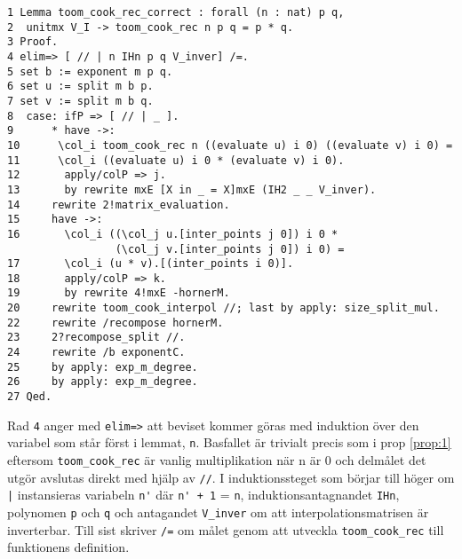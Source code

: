 \begin{verbatim}
1 Lemma toom_cook_rec_correct : forall (n : nat) p q,
2  unitmx V_I -> toom_cook_rec n p q = p * q.
3 Proof.
4 elim=> [ // | n IHn p q V_inver] /=.
5 set b := exponent m p q.
6 set u := split m b p.
7 set v := split m b q.    
8  case: ifP => [ // | _ ].
9      * have ->:
10      \col_i toom_cook_rec n ((evaluate u) i 0) ((evaluate v) i 0) =
11      \col_i ((evaluate u) i 0 * (evaluate v) i 0).
12       apply/colP => j.
13       by rewrite mxE [X in _ = X]mxE (IH2 _ _ V_inver).
14     rewrite 2!matrix_evaluation.
15     have ->:
16       \col_i ((\col_j u.[inter_points j 0]) i 0 * 
                 (\col_j v.[inter_points j 0]) i 0) =
17       \col_i (u * v).[(inter_points i 0)].
18       apply/colP => k.
19       by rewrite 4!mxE -hornerM.
20     rewrite toom_cook_interpol //; last by apply: size_split_mul.
22     rewrite /recompose hornerM.
23     2?recompose_split //.
24     rewrite /b exponentC.
25     by apply: exp_m_degree.
26     by apply: exp_m_degree.
27 Qed.
\end{verbatim}
Rad \verb+4+ anger med \verb+elim=>+ att beviset kommer göras med induktion över den variabel som står först i 
lemmat, \verb=n=. Basfallet är trivialt precis som i prop \ref{prop:1} eftersom \verb=toom_cook_rec= är 
vanlig multiplikation när n är 0 och delmålet det utgör avslutas direkt med hjälp av \verb=//=.
I induktionssteget som börjar till höger om \verb+|+ instansieras variabeln \verb=n'= där \verb=n' + 1=  = \verb=n=, 
induktionsantagnandet \verb=IHn=, polynomen \verb=p= och \verb=q= och antagandet \verb=V_inver= om att 
interpolationsmatrisen är inverterbar.
Till sist skriver \verb+/=+ om målet genom att utveckla \verb+toom_cook_rec+ till funktionens definition.

